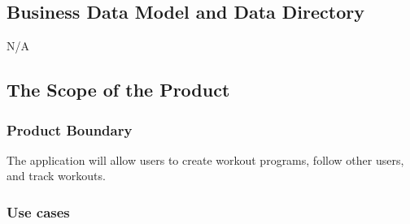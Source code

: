 \documentclass[12pt]{article}
\begin{document}
\subsection{Business Data Model and Data Directory}
N/A
\subsection{The Scope of the Product}
\subsubsection{Product Boundary}
The application will allow users to create workout programs, follow other users, and track workouts.
\subsubsection{Use cases}
\end{document}
